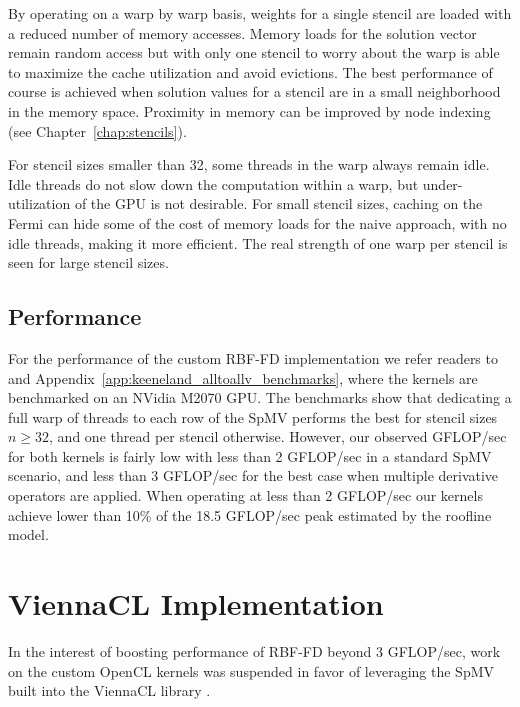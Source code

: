 \documentclass{report}
\begin{document}
By operating on a warp by warp basis, weights for a single stencil are loaded with a reduced number of memory accesses. Memory loads for the solution vector remain random access but with only one stencil to worry about the warp is able to maximize the cache utilization and avoid evictions. %
The best performance of course is achieved when solution values for a stencil are in a small neighborhood in the memory space. Proximity in memory can be improved by node indexing (see Chapter~\ref{chap:stencils}). 

For stencil sizes smaller than 32, some threads in the warp always remain idle. Idle threads do not slow down the computation within a warp, but under-utilization of the GPU is not desirable. For small stencil sizes, caching on the Fermi can hide some of the cost of memory loads for the naive approach, with no idle threads, making it more efficient. The real strength of one warp per stencil is seen for large stencil sizes. 

\subsection{Performance}

For the performance of the custom RBF-FD implementation we refer readers to \cite{BolligFlyerErlebacher2012} and Appendix~\ref{app:keeneland_alltoallv_benchmarks}, where the kernels are benchmarked on an NVidia M2070 GPU. The benchmarks show that dedicating a full warp of threads to each row of the SpMV performs the best for stencil sizes $n \geq 32$, and one thread per stencil otherwise. However, our observed GFLOP/sec for both kernels is fairly low with less than 2 GFLOP/sec in a standard SpMV scenario, and less than 3 GFLOP/sec for the best case when multiple derivative operators are applied. When operating at less than 2 GFLOP/sec our kernels achieve lower than 10\% of the 18.5 GFLOP/sec peak estimated by the roofline model. 


\section{ViennaCL Implementation} 

In the interest of boosting performance of RBF-FD beyond 3 GFLOP/sec, work on the custom OpenCL kernels was suspended in favor of leveraging the SpMV built into the ViennaCL library \cite{Rupp2010, Rupp2010a}.  
\end{document}
